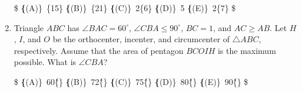 \documentclass{article}
\begin{document}
\begin{enumerate}[label=\arabic*., itemsep=0.5em]
\$
\textbf\{(A)\}\ \sqrt\{15\} \qquad
\textbf\{(B)\}\ \sqrt\{21\} \qquad
\textbf\{(C)\}\ 2\sqrt\{6\} \qquad
\textbf\{(D)\}\ 5 \qquad
\textbf\{(E)\}\ 2\sqrt\{7\} \$\par \vspace{0.5em}\item Triangle $ABC$ has $\angle BAC = 60^{\circ}$, $\angle CBA \leq 90^{\circ}$, $BC=1$, and $AC \geq AB$. Let $H$, $I$, and $O$ be the orthocenter, incenter, and circumcenter of $\triangle ABC$, respectively. Assume that the area of pentagon $BCOIH$ is the maximum possible. What is $\angle CBA$?

\$
\textbf\{(A)\}\ 60\^\{\circ\} \qquad
\textbf\{(B)\}\ 72\^\{\circ\} \qquad
\textbf\{(C)\}\ 75\^\{\circ\} \qquad
\textbf\{(D)\}\ 80\^\{\circ\} \qquad
\textbf\{(E)\}\ 90\^\{\circ\} \$\par \vspace{0.5em}\end{enumerate}
\end{document}
